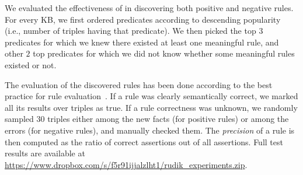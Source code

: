 We evaluated the effectiveness of \krd in discovering both positive and negative rules. 
For every KB, we first ordered predicates according to descending popularity (i.e., number of triples having that predicate). We then picked the top $3$ predicates for which we knew there existed at least one meaningful rule, and other $2$ top predicates for which we did not know whether some meaningful rules existed or not. 

The evaluation of the discovered rules 
has been done according to the best practice for rule evaluation~\cite{galarraga2015fast}. If a rule was clearly semantically correct, we marked all its results over triples as true. If a rule correctness was unknown, we randomly sampled 30 triples either among the new facts (for positive rules) or among the errors (for negative rules), 
and manually checked them. %
The \emph{precision} of a rule is then computed as the ratio of correct assertions out of all assertions. 
Full test results 
are available at \url{https://www.dropbox.com/s/f5r91ijjalzlht1/rudik_experiments.zip}.



